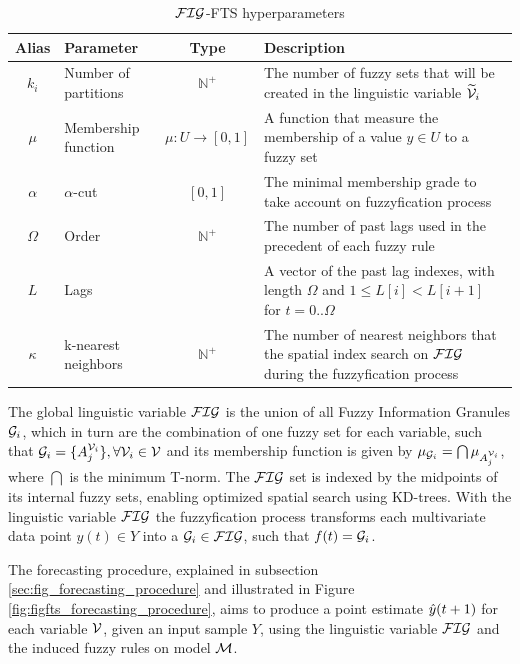 \begin{table}[]
    \centering
    \begin{tabular}{|c|m{2cm}|c|m{}|} \hline
        \textbf{Alias} & \textbf{Parameter} & \textbf{Type} & \textbf{Description}  \\ \hline
         $k_i$ & Number of partitions & $\mathbb{N}^+$ & The number of fuzzy sets that will be created in the linguistic variable $\widetilde{\mathcal{V}}_i$  \\ \hline
         $\mu$ & Membership function & $\mu: U \rightarrow [0,1] $ & A function that measure the membership of a value $y \in U$ to a fuzzy set  \\\hline
         $\alpha$ & $\alpha$-cut & $[0,1]$ & The minimal membership grade to take account on fuzzyfication process \\ \hline
         $\Omega$ & Order & $\mathbb{N}^+$ & The number of past lags used in the precedent of each fuzzy rule \\\hline
         $L$ & Lags & & A vector of the past lag indexes, with length $\Omega$ and $1 \leq L[i] < L[i+1]$ for  $t=0..\Omega$ \\ \hline
         $\kappa$ & k-nearest neighbors & $\mathbb{N}^+$ & The number of nearest neighbors that the spatial index search on $\mathcal{FIG}$ during the fuzzyfication process \\ \hline
    \end{tabular}
    \caption{$\mathcal{FIG}$-FTS hyperparameters}
    \label{tab:fig_hyperparameters}
\end{table}
\index{$\kappa$}

The global linguistic variable $\mathcal{FIG}$ is the union of all Fuzzy Information Granules $\mathcal{G}_i$, which in turn are the combination of one fuzzy set for each variable, such that $\mathcal{G}_i = \{ A_j^{\mathcal{V}_i} \}, \forall \mathcal{V}_i \in \mathcal{V}$ and its membership function is given by $\mu_{\mathcal{G}_i} = \bigcap \mu_{A_j^{\mathcal{V}_i}}$, where $\bigcap$ is the minimum T-norm. The $\mathcal{FIG}$ set is indexed by the midpoints of its internal fuzzy sets, enabling optimized spatial search using KD-trees.  
With the linguistic variable $\mathcal{FIG}$ the fuzzyfication process transforms each multivariate data point $y(t) \in Y$ into a  $\mathcal{G}_i \in \mathcal{FIG}$, such that $f(t) = \mathcal{G}_i$.

The forecasting procedure, explained in subsection \ref{sec:fig_forecasting_procedure} and illustrated in Figure \ref{fig:figfts_forecasting_procedure}, aims to produce a point estimate $\hat{y}(t+1)$ for each variable $\mathcal{V}$, given an input sample $Y$, using the linguistic variable $\mathcal{FIG}$ and the induced fuzzy rules on model $\mathcal{M}$.

